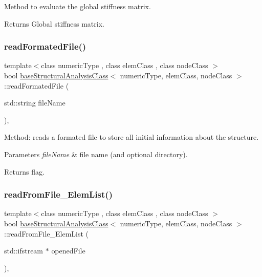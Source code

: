 Method to evaluate the global stiffness matrix. \begin{DoxyReturn}{Returns}
Global stiffness matrix. 
\end{DoxyReturn}
\mbox{\label{classbase_structural_analysis_class_aa21d6e5d9eea16e4fb57845d93d1ec4b}} 
\subsubsection{\texorpdfstring{read\+Formated\+File()}{readFormatedFile()}}
{\footnotesize\ttfamily template$<$class numeric\+Type , class elem\+Class , class node\+Class $>$ \\
bool \mbox{\hyperlink{classbase_structural_analysis_class}{base\+Structural\+Analysis\+Class}}$<$ numeric\+Type, elem\+Class, node\+Class $>$\+::read\+Formated\+File (\begin{DoxyParamCaption}\item[{std\+::string}]{file\+Name }\end{DoxyParamCaption})\hspace{0.3cm}{\ttfamily [protected]}, {\ttfamily [virtual]}}

Method\+: reads a formated file to store all initial information about the structure. 
\begin{DoxyParams}{Parameters}
{\em file\+Name} & file name (and optional directory). \\
\hline
\end{DoxyParams}
\begin{DoxyReturn}{Returns}
flag. 
\end{DoxyReturn}
\mbox{\label{classbase_structural_analysis_class_a57fe62169a4032b8c8393d9adb058343}} 
\subsubsection{\texorpdfstring{read\+From\+File\+\_\+\+Elem\+List()}{readFromFile\_ElemList()}}
{\footnotesize\ttfamily template$<$class numeric\+Type , class elem\+Class , class node\+Class $>$ \\
bool \mbox{\hyperlink{classbase_structural_analysis_class}{base\+Structural\+Analysis\+Class}}$<$ numeric\+Type, elem\+Class, node\+Class $>$\+::read\+From\+File\+\_\+\+Elem\+List (\begin{DoxyParamCaption}\item[{std\+::ifstream $\ast$}]{opened\+File }\end{DoxyParamCaption})\hspace{0.3cm}{\ttfamily [protected]}, {\ttfamily [virtual]}}

